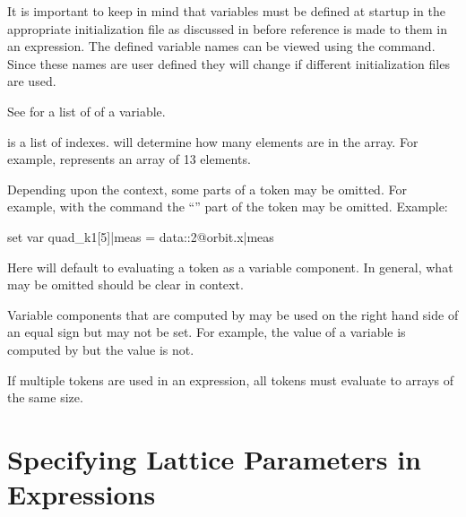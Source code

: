 It is important to keep in mind that variables must be defined at startup in the appropriate
initialization file as discussed in  before reference is made to them in an
expression.  The defined  variable names can be viewed using the 
command. Since these names are user defined they will change if different initialization files are
used.

See  for a list of  of a variable.

 is a list of indexes.  will determine how many elements are in
the array. For example,  represents an array of 13 elements.

Depending upon the context, some parts of a token may be omitted. For example, with the  command the ``'' part of the token may be omitted.  Example:
\begin{example}
  set var quad_k1[5]|meas = data::2@orbit.x|meas
\end{example}
Here \tao will default to evaluating a token as a variable component. In general, what may be
omitted should be clear in context.

Variable components that are computed by \tao may be used on the right hand side of an equal sign
but may not be set. For example, the  value of a variable is computed by \tao but the
 value is not.

If multiple tokens are used in an expression, all tokens must evaluate to arrays of the same size.

\section{Specifying Lattice Parameters in Expressions}
\label{s:lat.token}

